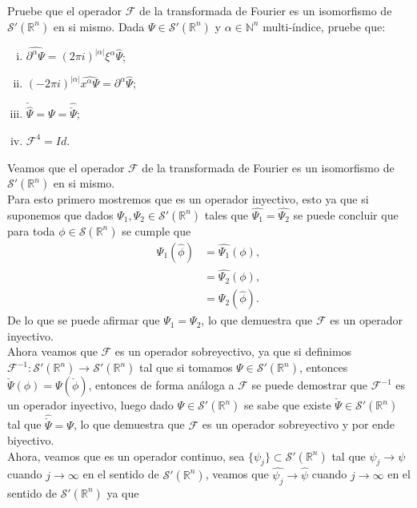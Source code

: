 \begin{homeworkProblem}
  Pruebe que el operador $\mathcal{F}$ de la transformada de Fourier es un isomorfismo de $\mathcal{S}'(\mathbb{R}^{n})$ en si mismo. Dada $\Psi \in \mathcal{S}'(\mathbb{R}^{n})$ y $\alpha\in\mathbb{N}^{n}$ multi-índice, pruebe que:
  \begin{enumerate}[(i)]
    \item $\hat{\partial^{\alpha}\Psi}=(2\pi i)^{|\alpha|}\xi^{\alpha}\hat{\Psi}$;
    \item $(-2\pi i)^{|\alpha|}\hat{x^{\alpha}\Psi}=\partial^{\alpha}\hat{\Psi}$;
    \item $\check{\hat{\Psi}}=\Psi=\hat{\check{\Psi}}$;
    \item $\mathcal{F}^{4}=Id$.
  \end{enumerate}
  \begin{solution}
    Veamos que el operador $\mathcal{F}$ de la transformada de Fourier es un isomorfismo de $\mathcal{S}'(\mathbb{R}^{n})$ en si mismo.\\
    Para esto primero mostremos que es un operador inyectivo, esto ya que si suponemos que dados $\Psi_{1},\Psi_{2}\in\mathcal{S}'(\mathbb{R}^{n})$ tales que $\hat{\Psi_{1}}=\hat{\Psi_{2}}$ se puede concluir que para toda $\phi\in\mathcal{S}(\mathbb{R}^{n})$ se cumple que
    \begin{align*}
      \Psi_{1}(\hat{\phi})&=\hat{\Psi_{1}}(\phi),\\
      &=\hat{\Psi_{2}}(\phi),\\
      &=\Psi_{2}(\hat{\phi}).
    \end{align*}
    De lo que se puede afirmar que $\Psi_{1}=\Psi_{2}$, lo que demuestra que $\mathcal{F}$ es un operador inyectivo.\\
    Ahora veamos que $\mathcal{F}$ es un operador sobreyectivo, ya que si definimos $\mathcal{F}^{-1}:\mathcal{S}'(\mathbb{R}^{n})\to\mathcal{S}'(\mathbb{R}^{n})$ tal que si tomamos $\Psi\in\mathcal{S}'(\mathbb{R}^{n})$, entonces $\check{\Psi}(\phi)=\Psi(\check{\phi})$, entonces de forma análoga a $\mathcal{F}$ se puede demostrar que $\mathcal{F}^{-1}$ es un operador inyectivo, luego dado $\Psi\in\mathcal{S}'(\mathbb{R}^{n})$ se sabe que existe $\check{\Psi}\in\mathcal{S}'(\mathbb{R}^{n})$ tal que $\hat{\check{\Psi}}=\Psi$, lo que demuestra que $\mathcal{F}$ es un operador sobreyectivo y por ende biyectivo.\\
    Ahora, veamos que es un operador continuo, sea $\{\psi_{j}\}\subset\mathcal{S}'(\mathbb{R}^{n})$ tal que $\psi_j\to\psi$ cuando $j\to\infty$ en el sentido de $\mathcal{S}'(\mathbb{R}^{n})$, veamos que $\hat{\psi_{j}}\to\hat{\psi}$ cuando $j\to\infty$ en el sentido de $\mathcal{S}'(\mathbb{R}^{n})$ ya que

\end{solution}
\end{homeworkProblem}

